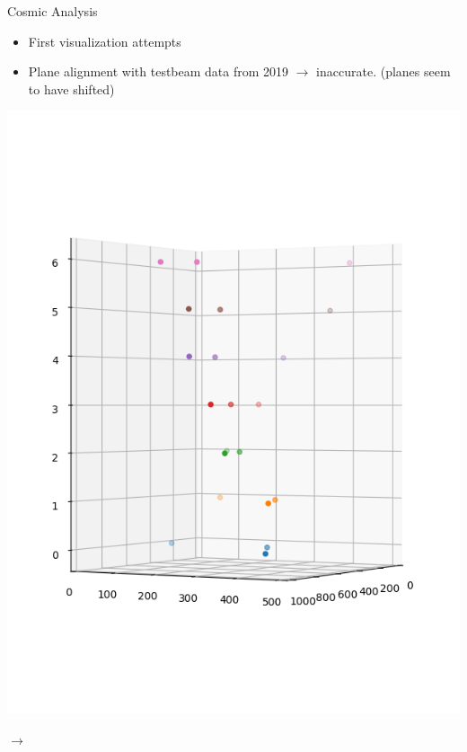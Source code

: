\documentclass{beamer}
\begin{document}
\begin{frame}{Cosmic Analysis}
    \footnotesize
    \begin{itemize}
	\item First visualization attempts
	\item Plane alignment with testbeam data from 2019 \( \rightarrow \)
	    inaccurate. \tiny (planes seem to have shifted) \footnotesize
    \end{itemize}
\begin{minipage}{.45\textwidth}
    \centering
    \includegraphics[trim=0 50 0 100,clip,width=\textwidth]{DESY_Before.png}
\end{minipage}
\begin{minipage}{.05\textwidth}
    \centering
    \( \rightarrow \)
\end{minipage}
\begin{minipage}{.45\textwidth}
    \centering

\end{minipage}
\end{frame}
\end{document}
